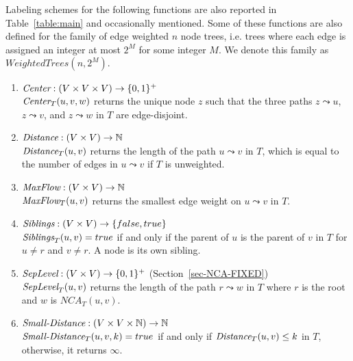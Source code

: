 	Labeling schemes for the following  functions are also reported in Table~\ref{table:main}  and occasionally mentioned.
	Some of these functions are also defined for the family of edge weighted $n$ node trees, i.e. trees where each edge is assigned an integer at most $2^M$ for some integer $M$.  We denote this family as $WeightedTrees(n,2^M)$. 
	\begin{enumerate}	
	\item $\emph{Center}: (V \times V \times V) \rightarrow \{ 0,1 \}^+$      %
	   \\ $\emph{Center}_T(u,v,w)$  returns the unique node $z$ such that the three paths  $z \leadsto u$, $z \leadsto v$, and  $z \leadsto w$  in $T$ are edge-disjoint.
	\item $\emph{Distance}: (V \times V) \rightarrow  \mathbb{N}$         %
	  \\ $\emph{Distance}_T(u,v)$ returns the length of the path  $u \leadsto v $ in $T$, which is  equal to the number of edges in $u \leadsto v$ if $T$ is unweighted. 
	\item $\emph{MaxFlow}: (V \times V) \rightarrow  \mathbb{N}$         %
	\\ $\emph{MaxFlow}_T(u,v) $ returns the smallest edge weight on $ u \leadsto v$  in $T$.
	\item $\emph{Siblings}: (V \times V) \rightarrow \{false,true\}$       %
	 \\ $\emph{Siblings}_T(u,v) = true$ if and only if  the parent of $u$ is the parent of $v$ in $T$ for $u \neq r$ and $v \neq r$. A node is its own sibling. 
	\item $\emph{SepLevel}: (V \times V) \rightarrow  \{ 0,1 \}^+$        (Section~\ref{sec-NCA-FIXED}) 			  \\ $\emph{SepLevel}_T(u,v)$ returns the length of the path  $r \leadsto w $ in $T$ where $r$ is the root and $w$ is $NCA_T(u,v)$.
	\item $\emph{Small-Distance}: (V \times V \times  \mathbb{N}) \rightarrow  \mathbb{N}$    
	\\ $\emph{Small-Distance}_T(u,v,k)= true$  if and only if $\emph{Distance}_T (u, v) \leq k$ in $T$, otherwise, it returns $\infty$.
	\end{enumerate}
	
